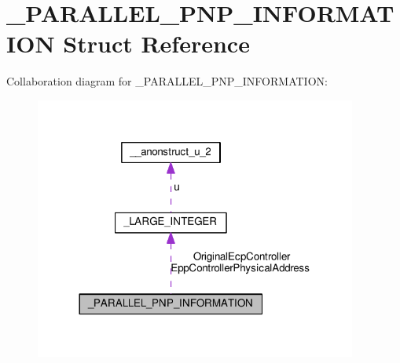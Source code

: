 \hypertarget{struct__PARALLEL__PNP__INFORMATION}{}\section{\+\_\+\+P\+A\+R\+A\+L\+L\+E\+L\+\_\+\+P\+N\+P\+\_\+\+I\+N\+F\+O\+R\+M\+A\+T\+I\+O\+N Struct Reference}
\label{struct__PARALLEL__PNP__INFORMATION}


Collaboration diagram for \+\_\+\+P\+A\+R\+A\+L\+L\+E\+L\+\_\+\+P\+N\+P\+\_\+\+I\+N\+F\+O\+R\+M\+A\+T\+I\+O\+N\+:
\nopagebreak
\begin{figure}[H]
\begin{center}
\leavevmode
\includegraphics[width=300pt]{struct__PARALLEL__PNP__INFORMATION__coll__graph}
\end{center}
\end{figure}
